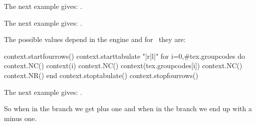 \stopnewprimitive

\startoldprimitive[title={\prm {currentgrouplevel}}]

\startbuffer
[\the\currentgrouplevel] \bgroup
    [\the\currentgrouplevel] \bgroup
        [\the\currentgrouplevel]
    \egroup [\the\currentgrouplevel]
\egroup [\the\currentgrouplevel]
\stopbuffer

The next example gives: \inlinebuffer.

\typebuffer

\stopoldprimitive

\startoldprimitive[title={\prm {currentgrouptype}}]

\startbuffer
[\the\currentgrouptype] \bgroup
    [\the\currentgrouptype] \begingroup
        [\the\currentgrouptype]
    \endgroup [\the\currentgrouptype]
    [\the\currentgrouptype] \beginmathgroup
        [\the\currentgrouptype]
    \endmathgroup [\the\currentgrouptype]
[\the\currentgrouptype] \egroup
\stopbuffer

The next example gives: \inlinebuffer.

\typebuffer

The possible values depend in the engine and for \LUAMETATEX\ they are:

\startluacode
context.startfourrows()
context.starttabulate { "|r|l|" }
for i=0,#tex.groupcodes do
    context.NC() context(i)
    context.NC() context(tex.groupcodes[i])
    context.NC() context.NR()
end
context.stoptabulate()
context.stopfourrows()
\stopluacode

\stopoldprimitive

\startoldprimitive[title={\prm {currentifbranch}}]

\startbuffer
[\the\currentifbranch] \iftrue
    [\the\currentifbranch] \iffalse
        [\the\currentifbranch]
    \else
        [\the\currentifbranch]
    \fi [\the\currentifbranch]
\fi [\the\currentifbranch]
\stopbuffer

The next example gives: \inlinebuffer.

\typebuffer

So when in the  branch we get plus one and when in the 
branch we end up with a minus one.

\stopoldprimitive

\startoldprimitive[title={\prm {currentiflevel}}]

\startbuffer
[\the\currentiflevel] \iftrue
    [\the\currentiflevel]\iftrue
        [\the\currentiflevel] \iftrue
            [\the\currentiflevel]
        \fi [\the\currentiflevel]
    \fi [\the\currentiflevel]
\fi [\the\currentiflevel]
\stopbuffer

